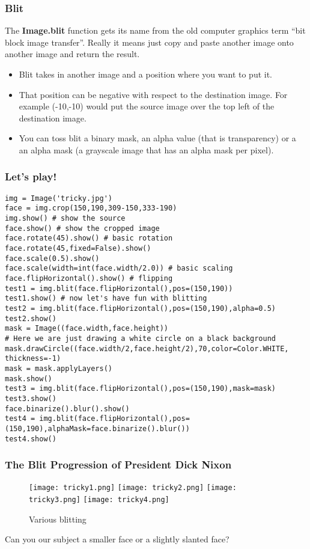 \documentclass[compress]{beamer}
\begin{document}
\begin{frame}
\frametitle{Blit}
The \textbf{Image.blit} function gets its name from the old computer graphics term ``bit block image
transfer''. Really it means just copy and paste another image onto
another image and return the result.
\begin{itemize}
\item Blit takes in another image and a position where you want to put
  it.
\item That position can be negative with respect to the destination
  image. For example (-10,-10) would put the source image over the top
  left of the destination image.
\item You can toss blit a binary mask, an alpha value (that is
  transparency) or a an alpha mask (a grayscale image that has an
  alpha mask per pixel).
\end{itemize}
\end{frame}
\begin{frame}[fragile] 
\frametitle{Let's play!}
\begin{example}
\begin{verbatim}
img = Image('tricky.jpg')
face = img.crop(150,190,309-150,333-190)
img.show() # show the source
face.show() # show the cropped image
face.rotate(45).show() # basic rotation
face.rotate(45,fixed=False).show()
face.scale(0.5).show()
face.scale(width=int(face.width/2.0)) # basic scaling
face.flipHorizontal().show() # flipping
test1 = img.blit(face.flipHorizontal(),pos=(150,190))
test1.show() # now let's have fun with blitting
test2 = img.blit(face.flipHorizontal(),pos=(150,190),alpha=0.5)
test2.show() 
mask = Image((face.width,face.height))
# Here we are just drawing a white circle on a black background
mask.drawCircle((face.width/2,face.height/2),70,color=Color.WHITE, thickness=-1)
mask = mask.applyLayers()
mask.show()
test3 = img.blit(face.flipHorizontal(),pos=(150,190),mask=mask)
test3.show()
face.binarize().blur().show()
test4 = img.blit(face.flipHorizontal(),pos=(150,190),alphaMask=face.binarize().blur())
test4.show()
\end{verbatim}
\end{example}
\end{frame}
\begin{frame}
\frametitle{The Blit Progression of President Dick Nixon}
 \begin{figure}
     \texttt{[image: tricky1.png]}
     \quad
     \texttt{[image: tricky2.png]}
     \quad
     \texttt{[image: tricky3.png]}
     \quad
     \texttt{[image: tricky4.png]}
     \quad
     \caption{Various blitting}
 \end{figure}
\large{Can you our subject a smaller face or a slightly slanted face? }
\end{frame}
\end{document}
